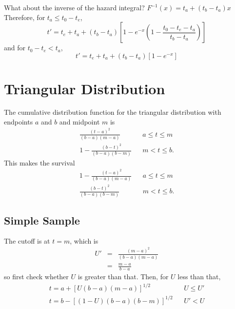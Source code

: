 \documentclass{article}
\begin{document}
What about the inverse of the hazard integral?
$F^{-1}(x)=t_a+(t_b-t_a)x$ Therefore, for $t_a\le t_0-t_e$,
\begin{equation}
  t'=t_e+t_a+(t_b-t_a)\left[1-e^{-x}\left(1-\frac{t_0-t_e-t_a}{t_b-t_a}\right)\right]
\end{equation}
and for $t_0-t_e< t_a$,
\begin{equation}
  t'=t_e+t_a+(t_b-t_a)\left[1-e^{-x}\right]
\end{equation}

\section{Triangular Distribution}
The cumulative distribution function for the triangular distribution
with endpoints $a$ and $b$ and midpoint $m$ is
\begin{eqnarray}
  \frac{(t-a)^2}{(b-a)(m-a)} & & a\le t \le m \\
  1-\frac{(b-t)^2}{(b-a)(b-m)} & & m<t\le b.
\end{eqnarray}
This makes the survival
\begin{eqnarray}
  1-\frac{(t-a)^2}{(b-a)(m-a)} & & a\le t \le m \\
  \frac{(b-t)^2}{(b-a)(b-m)} & & m<t\le b.
\end{eqnarray}
\subsection{Simple Sample}
The cutoff is at $t=m$, which is
\begin{eqnarray}
  U'&=&\frac{(m-a)^2}{(b-a)(m-a)} \\
  &=&\frac{m-a}{b-a}
\end{eqnarray}
so first check whether $U$ is greater than that. Then, for $U$
less than that,
\begin{eqnarray}
  t = a + \left[U(b-a)(m-a)\right]^{1/2} & & U\le U' \\
  t = b- \left[(1-U)(b-a)(b-m)\right]^{1/2} & & U'<U \\
\end{eqnarray}
\end{document}
